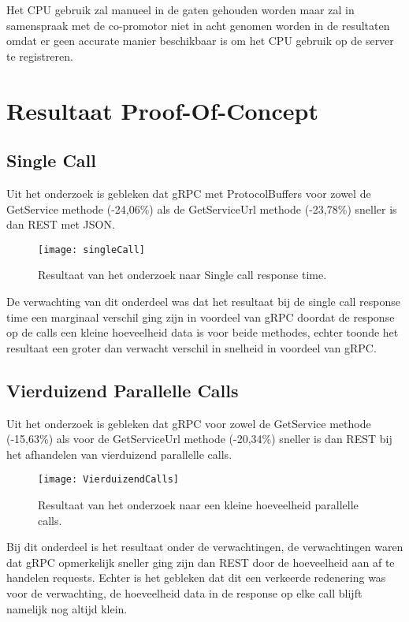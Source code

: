 Het CPU gebruik zal manueel in de gaten gehouden worden maar zal in samenspraak met de co-promotor niet in acht genomen worden in de resultaten omdat er geen accurate manier beschikbaar is om het CPU gebruik op de server te registreren.

\section{Resultaat Proof-Of-Concept}
\label{sec:Resultaat Proof-Of-Concept}

\subsection{Single Call}
\label{subsec:Single Call}
Uit het onderzoek is gebleken dat gRPC met ProtocolBuffers voor zowel de GetService methode (-24,06\%) als de GetServiceUrl methode (-23,78\%) sneller is dan REST met JSON.
\begin{figure}[H]
    \centering
    \texttt{[image: singleCall]}
    \caption[Single Call Response Time]{Resultaat van het onderzoek naar Single call response time.}
    \label{fig:SingleCallResult}
\end{figure}

De verwachting van dit onderdeel was dat het resultaat bij de single call response time een marginaal verschil ging zijn in voordeel van gRPC doordat de response op de calls een kleine hoeveelheid data is voor beide methodes, echter toonde het resultaat een groter dan verwacht verschil in snelheid in voordeel van gRPC.

\subsection{Vierduizend Parallelle Calls}
\label{subsec:Vierduizend parallelle calls}
Uit het onderzoek is gebleken dat gRPC voor zowel de GetService methode (-15,63\%) als voor de GetServiceUrl methode (-20,34\%) sneller is dan REST bij het afhandelen van vierduizend parallelle calls.
\begin{figure}[H]
    \centering
    \texttt{[image: VierduizendCalls]}
    \caption[Resultaten van vierduizend parallelle calls]{Resultaat van het onderzoek naar een kleine hoeveelheid parallelle calls.}
    \label{fig:VierduizendCallsResult}
\end{figure}

Bij dit onderdeel is het resultaat onder de verwachtingen, de verwachtingen waren dat gRPC opmerkelijk sneller ging zijn dan REST door de hoeveelheid aan af te handelen requests. Echter is het gebleken dat dit een verkeerde redenering was voor de verwachting, de hoeveelheid data in de response op elke call blijft namelijk nog altijd klein.


